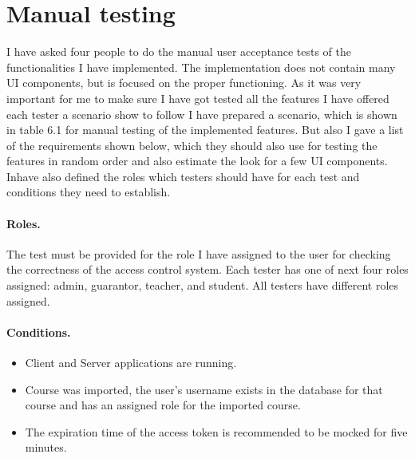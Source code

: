 \section{Manual testing} I have asked four people to do the manual user acceptance tests of the functionalities I have implemented. The implementation does not contain many UI components, but is focused on the proper functioning. As it was very important for me to make sure I have got tested all the features I have offered each tester a scenario show  to follow I have prepared a scenario, which is shown in table 6.1 for manual testing of the  implemented features. But also I gave a list of the requirements shown below, which they should also use for testing the features in random order and also estimate the look for a few UI components. Inhave also defined the roles which testers should have for each test and conditions they need to establish.  

\paragraph*{Roles.} The test must be provided for the role I have assigned to the user for checking the correctness of the access control system. Each tester has one of next four roles assigned: admin, guarantor, teacher, and student. All testers have different roles assigned.

\paragraph*{Conditions.} 
\begin{itemize}
    \item  Client and Server applications are running.
    \item  Course was imported, the user's username exists in the database for that course and has an assigned role for the imported course.
    \item  The expiration time of the access token is recommended to be mocked for five minutes.
\end{itemize}



